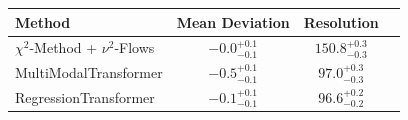     \begin{tabular}{lccc}
        \toprule
        Method & Mean Deviation & Resolution \\
        \midrule
        $\chi^2$-Method + $\nu^2$-Flows & $-0.0_{-0.1}^{+0.1}$ & $150.8_{-0.3}^{+0.3}$ \\
        MultiModalTransformer & $-0.5_{-0.1}^{+0.1}$ & $97.0_{-0.3}^{+0.3}$ \\
        RegressionTransformer & $-0.1_{-0.1}^{+0.1}$ & $96.6_{-0.2}^{+0.2}$ \\
        \bottomrule
    \end{tabular}